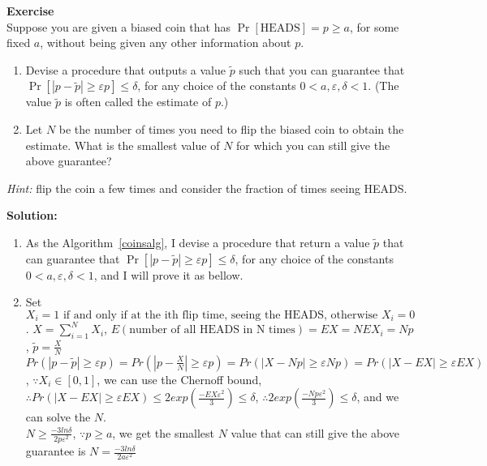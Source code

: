 \documentclass[a4paper,10pt]{article}
\newcounter{aufgc}
\newenvironment{exercise}[1]%
{\refstepcounter{aufgc}\textbf{Exercise \arabic{aufgc}} \emph{#1}\\}
{
	
	\hrulefill\medskip}%
\begin{document}
\begin{exercise}{}

	Suppose you are given a biased coin that has $\Pr[\text{HEADS}]=p\geq a$, for some fixed $a$, without being given any other information about $p$.
	\begin{enumerate}
		\item Devise a procedure that outputs a value $\tilde{p}$ such that you can guarantee that $\Pr[|p-\tilde{p}|\geq\varepsilon p] \leq \delta$, for any choice of the constants $0<a,\varepsilon,\delta<1$. (The value $\tilde{p}$ is often called the estimate of $p$.)
		\item Let $N$ be the number of times you need to flip the biased coin to obtain the estimate. What is the smallest value of $N$ for which you can still give the above guarantee?
	\end{enumerate}


	\medskip

	\emph{Hint:} flip the coin a few times and consider the fraction of times seeing HEADS.

	\hrulefill

	\textbf{Solution:}
	\begin{enumerate}

		\begin{algorithm}
			\label{coinsalg}
			\caption{COINSALG}
		\end{algorithm}
		\item As the Algorithm~\ref{coinsalg}, I devise a procedure that return a value $\tilde{p}$ that can guarantee that $\Pr[|p-\tilde{p}|\geq\varepsilon p] \leq \delta$, for any choice of the constants $0<a,\varepsilon,\delta<1$, and I will prove it as bellow.
		\item Set $X_i = 1 \text{ if and only if at the ith flip time, seeing the HEADS, otherwise } X_i = 0$. $X=\sum_{i=1}^{N}X_i$, $E(\text{number of all HEADS in N times}) = EX = NEX_i = Np$, $\tilde{p}=\frac{X}{N}$ \\
		      $Pr(|p-\tilde{p}|\ge \varepsilon p) = Pr(|p-\frac{X}{N}|\ge \varepsilon p )= Pr(|X-Np|\ge \varepsilon Np) = Pr(|X-EX|\ge \varepsilon EX)$, $\because X_i \in [0,1]$, we can use the Chernoff bound, $\therefore Pr(|X-EX|\ge \varepsilon EX) \le 2exp(\frac{-EX\varepsilon^2}{3}) \le \delta$, $\therefore 2exp(\frac{-Np\varepsilon^2}{3}) \le \delta$, and we can solve the $N$. \\
		      $N \ge \frac{-3ln \delta}{2p\varepsilon^2}$, $\because p\ge a$, we get the smallest $N$ value that can still give the above guarantee is $N=\frac{-3ln \delta}{2a\varepsilon^2}$



\end{enumerate}
\end{exercise}
\end{document}
